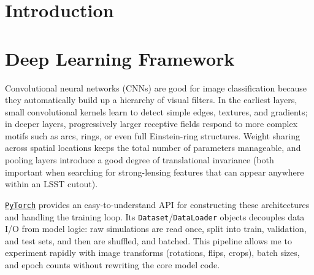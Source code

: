 \documentclass[trackchanges,twocolumn]{aastex7}
\begin{document}
\section{Introduction}






\section{Deep Learning Framework} \label{sec:deep-learning-framework}

Convolutional neural networks (CNNs) are good for image classification because they automatically build up a hierarchy of visual filters. In the earliest layers, small convolutional kernels learn to detect simple edges, textures, and gradients; in deeper layers, progressively larger receptive fields respond to more complex motifs such as arcs, rings, or even full Einstein-ring structures. Weight sharing across spatial locations keeps the total number of parameters manageable, and pooling layers introduce a good degree of translational invariance (both important when searching for strong-lensing features that can appear anywhere within an LSST cutout).

 \href{https://pytorch.org/}{\tt\string PyTorch} provides an easy-to-understand API for constructing these architectures and handling the training loop. Its {\tt\string Dataset}/{\tt\string DataLoader} objects decouples data I/O from model logic: raw simulations are read once, split into train, validation, and test sets, and then are shuffled, and batched. This pipeline allows me to experiment rapidly with image transforms (rotations, flips, crops), batch sizes, and epoch counts without rewriting the core model code.
\end{document}
